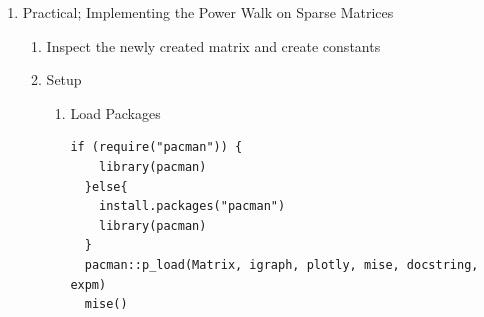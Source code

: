\documentclass[11pt]{article}
\begin{document}
\begin{enumerate}
\begin{enumerate}
\[\begin{aligned}
\begin{array}{c}
       \overrightarrow{\delta^{{\footnotesize \tmmathbf{T}}}} \vec{p}_i\\
       \overrightarrow{\delta^{{\footnotesize \tmmathbf{T}}}} \vec{p}_i\\
       \vdots
     \end{array} \right) \nonumber\\
     & = \overrightarrow{\delta^{{\footnotesize \tmmathbf{T}}}}
     \overrightarrow{p_i} \left( \begin{array}{c}
       1\\
       1\\
       1\\
       \vdots
     \end{array} \right) \nonumber\\
     & = (\overrightarrow{\delta^{{\footnotesize \tmmathbf{T}}}}
     \overrightarrow{p_i})  \vec{1}\\
     & = \mathtt{repeat} (\overrightarrow{\delta} \overrightarrow{p_i}
     \mathtt{, n}) \label{eq:sparse-power-walk}
   \end{aligned} \]
Observe also that If we let \(\vec{\delta}\) and \(p_i\) be 1 dimensional
vectors, this can also be expressed as a dot product:

\begin{center}
\begin{tabular}{ll}
Matrices & Vectors\\
\(\vec{\delta^{\mathrm{T}}} \vec{p_{i}}\) & \(\vec{\delta} \vec{p_{i}}\)\\
\end{tabular}
\end{center}
\end{enumerate}

\item Practical; Implementing the Power Walk on Sparse Matrices
\label{sec:org91cf875}
\begin{enumerate}
\item Inspect the newly created matrix and create constants
\label{sec:org22d9c80}
\item Setup
\label{sec:orgd7ad28a}
\begin{enumerate}
\item Load Packages
\label{sec:org192c02f}
\lstset{language=r,label= ,caption= ,captionpos=b,numbers=none}
\begin{lstlisting}
if (require("pacman")) {
    library(pacman)
  }else{
    install.packages("pacman")
    library(pacman)
  }
  pacman::p_load(Matrix, igraph, plotly, mise, docstring, expm)
  mise()
\end{lstlisting}


\end{enumerate}
\end{enumerate}
\end{enumerate}
\end{document}

